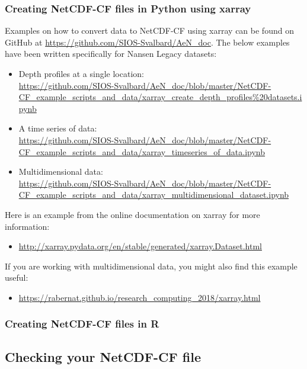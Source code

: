 \documentclass[a4paper,english, 11pt]{article}
\begin{document}
\subsubsection{Creating NetCDF-CF files in Python using xarray}
\label{ss:xarray}

Examples on how to convert data to NetCDF-CF using xarray can be found on GitHub at \href{https://github.com/SIOS-Svalbard/AeN_doc}{https://github.com/SIOS-Svalbard/AeN\_doc}. The below examples have been written specifically for Nansen Legacy datasets:

\begin{itemize}
\item{Depth profiles at a single location: \\ 
\url{https://github.com/SIOS-Svalbard/AeN_doc/blob/master/NetCDF-CF_example_scripts_and_data/xarray_create_depth_profiles\%20datasets.ipynb}}
\item{A time series of data: \\ 
\url{https://github.com/SIOS-Svalbard/AeN_doc/blob/master/NetCDF-CF_example_scripts_and_data/xarray_timeseries_of_data.ipynb}} 
\item{Multidimensional data: \\ 
\url{https://github.com/SIOS-Svalbard/AeN_doc/blob/master/NetCDF-CF_example_scripts_and_data/xarray_multidimensional_dataset.ipynb}}
\end{itemize}

Here is an example from the online documentation on xarray for more information:
\begin{itemize}
\item \url{http://xarray.pydata.org/en/stable/generated/xarray.Dataset.html}
\end{itemize}

If you are working with multidimensional data, you might also find this example useful:
\begin{itemize}
\item \url{https://rabernat.github.io/research_computing_2018/xarray.html}
\end{itemize}

\subsubsection{Creating NetCDF-CF files in R}
\label{ss:R}

\subsection{Checking your NetCDF-CF file}
\label{ss:netcdf_checker}
\end{document}
